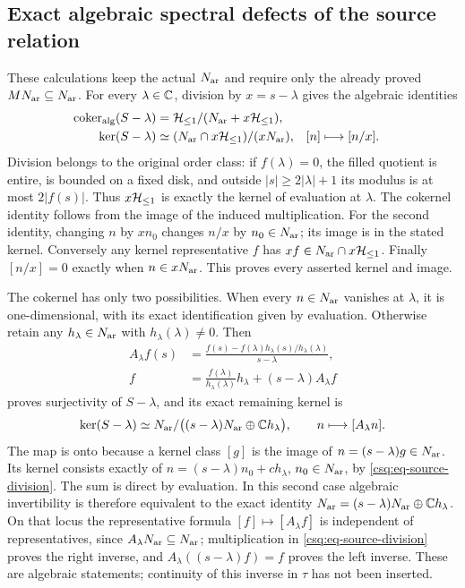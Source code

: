 \subsection{Exact algebraic spectral defects of the source relation}
\label{csq:sec-sourcealgebra}
These calculations keep the actual $N_{\rm ar}$ and require only the
already proved $MN_{\rm ar}\subseteq N_{\rm ar}$. For every $\lambda\in\mathbb C$,
division by $x=s-\lambda$ gives the algebraic identities
\begin{equation}\label{csq:eq-source-kercoker}
 \begin{aligned}
 \operatorname{coker}_{\rm alg}(S-\lambda)
     &=\mathcal H_{\leq 1}/(N_{\rm ar}+x\mathcal H_{\leq 1}),\\
 \ker(S-\lambda)&\simeq
        (N_{\rm ar}\cap x\mathcal H_{\leq 1})/(xN_{\rm ar}),
        & [n]&\longmapsto[n/x].
 \end{aligned}
\end{equation}
Division belongs to the original order class: if $f(\lambda)=0$,
the filled quotient is entire, is bounded on a fixed disk, and
outside $|s|\geq2|\lambda|+1$ its modulus is at most $2|f(s)|$.
Thus $x\mathcal H_{\leq 1}$ is exactly the kernel of evaluation at $\lambda$.
The cokernel identity follows from the image of the induced
multiplication. For the second identity, changing $n$ by $xn_0$
changes $n/x$ by $n_0\in N_{\rm ar}$; its image is in the stated
kernel. Conversely any kernel representative $f$ has
$xf\in N_{\rm ar}\cap x\mathcal H_{\leq 1}$. Finally $[n/x]=0$ exactly when
$n\in xN_{\rm ar}$. This proves every asserted kernel and image.

The cokernel has only two possibilities. When every $n\in N_{\rm ar}$
vanishes at $\lambda$, it is one-dimensional, with its exact
identification given by evaluation. Otherwise retain any
$h_\lambda\in N_{\rm ar}$ with $h_\lambda(\lambda)\ne0$. Then
\begin{equation}\label{csq:eq-source-division}
 \begin{aligned}
 A_\lambda f(s)&=
  \frac{f(s)-f(\lambda)h_\lambda(s)/h_\lambda(\lambda)}{s-\lambda},\\
 f&=\frac{f(\lambda)}{h_\lambda(\lambda)}h_\lambda
                                      +(s-\lambda)A_\lambda f
 \end{aligned}
\end{equation}
proves surjectivity of $S-\lambda$, and its exact remaining kernel is
\begin{equation}\label{csq:eq-source-splitting}
 \ker(S-\lambda)\simeq
 N_{\rm ar}/\bigl((s-\lambda)N_{\rm ar}\oplus\mathbb C h_\lambda\bigr),
 \qquad n\longmapsto[A_\lambda n].
\end{equation}
The map is onto because a kernel class $[g]$ is the image of
$n=(s-\lambda)g\in N_{\rm ar}$. Its kernel consists exactly of
$n=(s-\lambda)n_0+c h_\lambda$, $n_0\in N_{\rm ar}$, by
\eqref{csq:eq-source-division}. The sum is direct by evaluation.
In this second case algebraic invertibility is therefore equivalent
to the exact identity
$N_{\rm ar}=(s-\lambda)N_{\rm ar}\oplus\mathbb C h_\lambda$.
On that locus the representative formula $[f]\mapsto[A_\lambda f]$
is independent of representatives, since $A_\lambda N_{\rm ar}\subseteq
N_{\rm ar}$; multiplication in \eqref{csq:eq-source-division} proves the
right inverse, and $A_\lambda((s-\lambda)f)=f$ proves the left
inverse. These are algebraic statements; continuity of this inverse
in $\tau$ has not been inserted.

